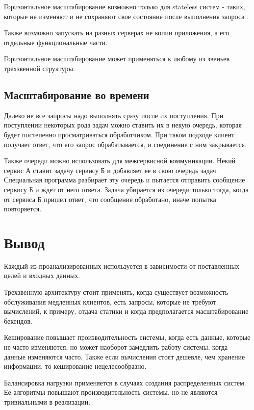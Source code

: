 Горизонтальное масштабирование возможно только для stateless систем - таких, которые не изменяют и не сохраняют свое состояние после выполнения запроса \cite{burns}.

Также возможно запускать на разных серверах не копии приложения, а его отдельные функциональные части.

Горизонтальное масштабирование может применяться к любому из звеньев трехзвенной структуры.

\subsection{Масштабирование во времени}

Далеко не все запросы надо выполнять сразу после их поступления. При поступлении некоторых рода задач можно ставить их в некую очередь, которая будет постепенно просматриваться обработчиком. При таком подходе клиент получает ответ, что его запрос обрабатывается, и соединение с ним закрывается.

Также очереди можно использовать для межсервисной коммуникации. Некий сервис А ставит задачу сервису Б и добавляет ее в свою очередь задач. Специальная программа разбирает эту очередь и пытается отправить сообщение сервису Б и ждет от него ответа. Задача убирается из очереди только тогда, когда от сервиса Б пришел ответ, что сообщение обработано, иначе попытка повторяется.

\section{Вывод}

Каждый из проанализированных используется в зависимости от поставленных целей и входных данных.

Трехзвенную архитектуру стоит применять, когда существует возможность обслуживания медленных клиентов, есть запросы, которые не требуют вычислений, к примеру, отдача статики и когда предполагается масштабирование бекендов.

Кеширование повышает производительность системы, когда есть данные, которые не часто изменяются, но может наоборот замедлить работу системы, когда данные изменяются часто. Также если вычисления стоят дешевле, чем хранение информации, то кеширование нецелесообразно.

Балансировка нагрузки применяется в случаях создания распределенных систем. Ее алгоритмы повышают производительность системы, но не являются тривиальными в реализации.